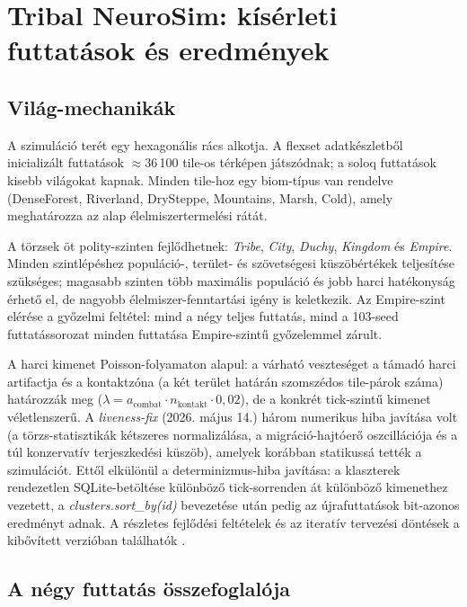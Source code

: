 \chapter{Tribal NeuroSim: kísérleti futtatások és eredmények}

\section{Világ-mechanikák}

A szimuláció terét egy hexagonális rács alkotja. A flexset adatkészletből inicializált futtatások $\approx$36\,100 tile-os térképen játszódnak; a soloq futtatások kisebb világokat kapnak. Minden tile-hoz egy biom-típus van rendelve (DenseForest, Riverland, DrySteppe, Mountains, Marsh, Cold), amely meghatározza az alap élelmiszertermelési rátát.

A törzsek öt polity-szinten fejlődhetnek: \textit{Tribe}, \textit{City}, \textit{Duchy}, \textit{Kingdom} és \textit{Empire}. Minden szintlépéshez populáció-, terület- és szövetségesi küszöbértékek teljesítése szükséges; magasabb szinten több maximális populáció és jobb harci hatékonyság érhető el, de nagyobb élelmiszer-fenntartási igény is keletkezik. Az Empire-szint elérése a győzelmi feltétel: mind a négy teljes futtatás, mind a 103-seed futtatássorozat minden futtatása Empire-szintű győzelemmel zárult.

A harci kimenet Poisson-folyamaton alapul: a várható veszteséget a támadó harci artifactja és a kontaktzóna (a két terület határán szomszédos tile-párok száma) határozzák meg ($\lambda = a_{\text{combat}} \cdot n_{\text{kontakt}} \cdot 0{,}02$), de a konkrét tick-szintű kimenet véletlenszerű. A \textit{liveness-fix} (2026. május 14.) három numerikus hiba javítása volt (a törzs-statisztikák kétszeres normalizálása, a migráció-hajtóerő oszcillációja és a túl konzervatív terjeszkedési küszöb), amelyek korábban statikussá tették a szimulációt. Ettől elkülönül a determinizmus-hiba javítása: a klaszterek rendezetlen SQLite-betöltése különböző tick-sorrenden át különböző kimenethez vezetett, a \textit{clusters.sort\_by(id)} bevezetése után pedig az újrafuttatások bit-azonos eredményt adnak. A részletes fejlődési feltételek és az iteratív tervezési döntések a kibővített verzióban találhatók \cite{premadegraph-full}.

\section{A négy futtatás összefoglalója}

